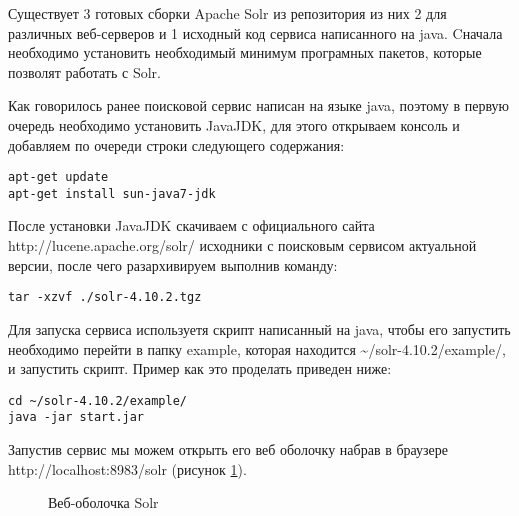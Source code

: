 Существует 3 готовых сборки Apache Solr из репозитория из них 2 для различных веб-серверов и 1 исходный код сервиса написанного на java. Cначала необходимо установить необходимый минимум програмных пакетов, которые позволят работать с Solr.

Как говорилось ранее поисковой сервис написан на языке java, поэтому в первую очередь необходимо установить JavaJDK, для этого открываем консоль и добавляем по очереди строки следующего содержания:

\begin{lstlisting}
apt-get update
apt-get install sun-java7-jdk
\end{lstlisting}

После установки JavaJDK скачиваем с официального сайта http://lucene.apache.org/solr/ исходники с поисковым сервисом актуальной версии, после чего разархивируем выполнив команду:

\begin{lstlisting}
tar -xzvf ./solr-4.10.2.tgz
\end{lstlisting}

Для запуска сервиса используетя скрипт написанный на java, чтобы его запустить необходимо перейти в папку example, которая находится \textasciitilde/solr-4.10.2/example/, и запустить скрипт. Пример как это проделать приведен ниже:

\begin{lstlisting}
cd ~/solr-4.10.2/example/
java -jar start.jar
\end{lstlisting}

Запустив сервис мы можем открыть его веб оболочку набрав в браузере http://localhost:8983/solr (рисунок \ref{ris:solr}).

\begin{figure}[h] 
\caption{Веб-оболочка Solr}
\label{ris:solr}
\end{figure}
